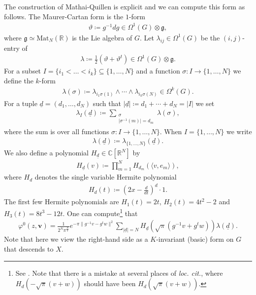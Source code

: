 \documentclass[twoside,a4paper,10pt]{article} %
\newcommand{\uud}{\underline{d}}
\newcommand{\8}{\infty}
\newcommand{\vbf}{\mathbf{v}}
\newcommand{\R}{\mathbb{R}}
\newcommand{\C}{\mathbb{C}}
\newcommand{\g}{\mathfrak{g}}
\newcommand{\Mat}{\mathrm{Mat}}
\theoremstyle{mytheoremstyle}
\theoremstyle{remark}
\numberwithin{equation}{section}
\begin{document}
The construction of Mathai-Quillen is explicit and we can compute this form as follows. The Maurer-Cartan form is the $1$-form
\begin{align}
\vartheta\coloneqq g^{-1}dg \in \Omega^1(G)\otimes \g,
\end{align}
where $\g \simeq \Mat_N(\R)$ is the Lie algebra of $G$. Let $\lambda_{ij} \in \Omega^1(G)$ be the $(i,j)$-entry of 
\begin{align} \label{form lambda}
\lambda \coloneqq \frac{1}{2}(\vartheta+\vartheta^t) \in \Omega^1(G) \otimes \g.
\end{align} For a subset $I=\{i_1<\dots<i_k\} \subseteq \{1,\dots,N\}$ and a function $\sigma \colon I \longrightarrow \{ 1, \dots, N \}$ we define the $k$-form
\begin{align}
    \lambda(\sigma) \coloneqq \lambda_{i_1\sigma(1)} \wedge  \cdots \wedge \lambda_{i_k\sigma(N)} \in \Omega^{k}(G).
\end{align}
For a tuple $\uud=(d_1, \dots,d_N)$ such that $\vert \uud \vert \coloneqq d_1+\cdots+d_N=\vert I \vert$ we set
\begin{align}
\lambda_I(\uud) \coloneqq \sum_{\substack{\sigma \\ \vert \sigma^{-1}(m) \vert=d_m}} \lambda(\sigma),
\end{align}
where the sum is over all functions $\sigma \colon I \longrightarrow \{ 1, \dots, N \}$. When $I=\{ 1, \dots, N \}$ we write
\begin{align}
\lambda(\uud) \coloneqq \lambda_{\{ 1, \dots, N \}}(\uud).
\end{align}
We also define a polynomial $H_{\uud} \in \C[\R^{N}]$ by
\begin{align}
    H_{\uud}(v)  \coloneqq \prod_{m=1}^NH_{d_m}(\langle v,e_m\rangle),
\end{align}
where $H_d$ denotes the single variable Hermite polynomial
\begin{align}
H_d(t) \coloneqq \left (2x-\frac{d}{dt} \right )^d \cdot 1.
\end{align} The first few Hermite polynomials are $H_1(t)=2t$, $H_2(t)=4t^2-2$ and $H_3(t)=8t^3-12t$. One can compute\footnote{See \cite[Proposition.~3.7]{rbrsln}. Note that there is a mistake at several places of {\em loc. cit.}, where $H_d(-\sqrt{\pi}(v+w))$ should have been $H_d(\sqrt{\pi}(v+w))$.} that
\begin{align} \label{formula varphi zero}
\varphi^0(z,\vbf)=\frac{1}{2^{N}\pi^{\frac{N}{2}}}e^{-\pi \lVert g^{-1}v-g^t w \rVert^2} \sum_{\vert \uud \vert=N } H_{\uud}(\sqrt{\pi}(g^{-1}v+g^t w)) \lambda(\uud).
\end{align}
Note that here we view the right-hand side as a $K$-invariant (basic) form on $G$ that descends to $X$.
\end{document}
